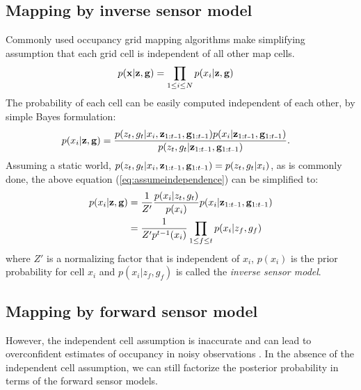 \documentclass[letterpaper, 10 pt, conference]{ieeeconf} %
\begin{document}
\subsection{Mapping by inverse sensor model}
Commonly used occupancy grid mapping algorithms
\cite{elfes1989using,moravec1988sensor,newcombe2011kinectfusion} make
simplifying assumption that each grid cell is independent of all other map
cells. 
\newcommand{\remaining}{\measurements_{\prevtime}, \poses_{\prevtime}}
\begin{align}
  p(\mathbf{x}|\mathbf{z}, \mathbf{g}) &= \prod_{1 \le i \le N} p(x_i|\mathbf{z}, \mathbf{g})
\end{align}
The probability of each cell can be easily computed independent of each other,
by simple Bayes formulation:
\begin{align}
  p(x_i|\measurements, \poses) &= \frac{p(\meas_t, \pose_t|x_i, \remaining)p(x_i|\remaining)}
                         {p(\meas_t, \pose_t|\remaining)}.
  \label{eq:assumeindependence}
\end{align}
Assuming a static world, $p(z_t, g_t|x_i, \remaining) = p(z_t, g_t|x_i)$, as is 
commonly done, the
above equation (\ref{eq:assumeindependence}) can be simplified \cite{merali2013icra} to:
\begin{align}
 p(x_i|\measurements, \poses) 
 &= \frac{1}{Z'}\frac{p(x_i|\meas_t, \pose_t)}{p(x_i)}p(x_i|\remaining)\\
 &= \frac{1}{Z'p^{t-1}(x_i)}\prod_{1\le f \le t} p(x_i|\meas_f, \pose_f)
\end{align}
where $Z'$ is a normalizing factor that is independent of $x_i$, $p(x_i)$ is
the prior probability for cell $x_i$ and $p(x_i|z_f, g_f)$ is called the
\textit{inverse sensor model}.

\subsection{Mapping by forward sensor model}
However, the independent cell assumption is inaccurate and can lead to
overconfident estimates of occupancy in noisy observations
\cite{thrun2003learning,merali2013icra}. In the absence of the independent cell
assumption, we can still factorize the posterior probability in terms of the
forward sensor models.
\end{document}

